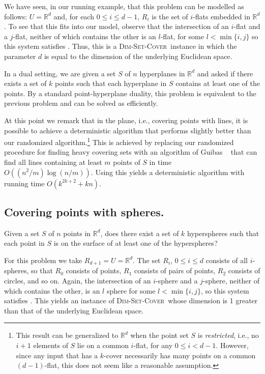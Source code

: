 \documentclass[ccfonts,lotsofwhite]{patmorin}
\newcommand{\setcover}{\textsc{Dim-Set-Cover}}
\begin{document}
We have seen, in our running example, that this problem can be
modelled as follows: $U=\mathbb{R}^d$ and, for each $0\le i\le d-1$,
$R_i$ is the set of $i$-flats embedded in $\mathbb{R}^d$.  To see that
this fits into our model, observe that the intersection of an $i$-flat
and a $j$-flat, neither of which contains the other is an $l$-flat,
for some $l<\min\{i,j\}$ so this system satisfies
.  Thus, this is a \setcover\ instance in which
the parameter $d$ is equal to the dimension of the underlying
Euclidean space.

In a dual setting, we are given a set $S$ of $n$ hyperplanes in
$\mathbb{R}^d$ and asked if there exists a set of $k$ points such that
each hyperplane in $S$ contains at least one of the points.  By a
standard point-hyperplane duality, this problem is equivalent to the
previous problem and can be solved as efficiently.

At this point we remark that in the plane, i.e., covering points with
lines, it is possible to achieve a deterministic algorithm that
performs slightly better than our randomized algorithm.\footnote{This
result can be generalized to $\mathbb{R}^d$ when the point set $S$ is
\emph{restricted}, i.e., no $i+1$ elements of $S$ lie on a common
$i$-flat, for any $0\le i<d-1$.  However, since any input that has a
$k$-cover necessarily has many points on a common $(d-1)$-flat, this
does not seem like a reasonable assumption.}  This is achieved by
replacing our randomized procedure for finding heavy covering sets
with an algorithm of Guibas \etal\ \cite{gor96} that can find all
lines containing at least $m$ points of $S$ in time $O((n^2/m)\log
(n/m))$.  Using this yields a deterministic algorithm with running time
$O(k^{2k+2}+kn)$.

\subsection{Covering points with spheres.}

Given a set $S$ of $n$ points in $\mathbb{R}^d$, does there exist a
set of $k$ hyperspheres such that each point in $S$ is on the surface
of at least one of the hyperspheres? 

For this problem we take $R_{d+1}=U=\mathbb{R}^d$.  The set $R_i$,
$0\le i\le d$ consists of all $i$-spheres, so that $R_0$ consists of
points, $R_1$ consists of pairs of points, $R_2$ consists of circles,
and so on.  Again, the intersection of an $i$-sphere and a $j$-sphere,
neither of which contains the other, is an $l$ sphere for some
$l<\min\{i, j\}$, so this system satisfies .
This yields an instance of \setcover\ whose dimension is 1 greater
than that of the underlying Euclidean space.
\end{document}
